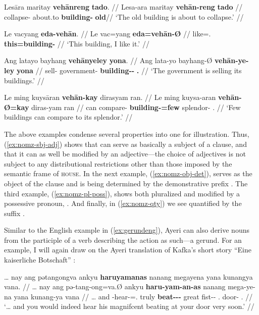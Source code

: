 \pex
\a\label{ex:nomz-sbj-adj}\begingl
	\gla Lesāra maritay \textbf{vehānreng} \textbf{tado}. //
	\glb Lesa-ara maritay \textbf{vehān-reng} \textbf{tado} //
	\glc collapse-\TsgI{} about.to \textbf{building-\AargI{}} \textbf{old}//
	\glft `The old building is about to collapse.' //
\endgl

\a\label{ex:nomz-obj-det}\begingl
	\gla Le vacyang \textbf{eda-vehān}. //
	\glb Le vac=yang \textbf{eda=vehān-Ø} //
	\glc \PatTI{} like=\Fsg{}.\Aarg{} \textbf{this=building-\Top{}} //
	\glft `This building, I like it.' //
\endgl

\a\label{ex:nomz-pl-poss}\begingl
	\gla Ang latayo bayhang \textbf{vehānyeley} \textbf{yona}. //
	\glb Ang lata-yo bayhang-Ø \textbf{vehān-ye-ley} \textbf{yona} //
	\glc \AgtT{} sell-\TsgN{} government-\Top{} 
		\textbf{building-\Pl{}-\PargI{}} \textbf{\TsgN{}.\Gen{}} //
	\glft `The government is selling its buildings.' //
\endgl

\a\label{ex:nomz-qty}\begingl
	\gla Le ming kuysāran \textbf{vehān-kay} dirasyam ran. //
	\glb Le ming kuysa-aran \textbf{vehān-Ø=kay} diras-yam ran //
	\glc \PatTI{} can compare-\TplI{} \textbf{building-\Top=few} 
		splendor-\Dat{} \TsgI{}.\Gen{} //
	\glft `Few buildings can compare to its splendor.' //
\endgl
\xe

The above examples condense several properties into one for illustration. Thus, 
(\ref{ex:nomz-sbj-adj}) shows that  can serve as basically 
a subject of a clause, and that it can as well be modified by an 
adjective---the choice of adjectives is not subject to any distributional 
restrictions other than those imposed by the semantic frame of 
\textsc{house}. In the next example, (\ref{ex:nomz-obj-det}), 
 serves as the object of the clause and is being determined 
by the demonstrative prefix . The third example, 
(\ref{ex:nomz-pl-poss}), shows  both pluralized and 
modified by a possessive pronoun, . And finally, in 
(\ref{ex:nomz-qty}) we see  quantified by the suffix 
.

Similar to the English example in (\ref{ex:gerundeng}), Ayeri can also derive 
nouns from the participle of a verb describing the action as such---a gerund. 
For an example, I will again draw on the Ayeri translation of Kafka's short 
story \enquote{Eine kaiserliche Botschaft} \citep[2, 14]{becker:kafka:imperial}:

\ex\label{ex:kafkagerund}\begingl
	\gla … nay ang pətangongva ankyu \textbf{haruyamanas} nanang megayena 
		yana kunangya vana. //
	\glb … nay ang pə-tang-ong=va.Ø ankyu \textbf{haru-yam-an-as} nanang 
		mega-ye-na yana kunang-ya vana //
	\glc … and \AgtT{} \NFut{}-hear-\Irr{}=\Ssg{}.\Top{} truly 
		\textbf{beat-\Ptcp{}-\Nmlz{}-\Parg{}} great fist-\Pl{}-\Gen{} 
		\TsgM{}.\Gen{} door-\Loc{} \Ssg{}.\Gen{} //
	\glft `… and you would indeed hear his magnifcent beating at your door 
		very soon.' //
\endgl\xe

